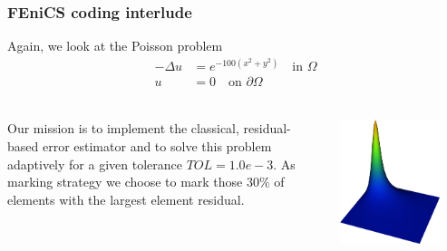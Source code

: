 \begin{frame}
    \frametitle{FEniCS coding interlude}
    Again, we look at the Poisson problem
    \begin{align*}
        -\Delta u &= e^{-100(x^2 + y^2)} \quad \text{in } \Omega \\
                u &= 0 \quad \text{on } \partial \Omega \\
    \end{align*}
    \vspace{-3em}
    \begin{columns}[c]
        \begin{column}{0.5\textwidth}
    Our mission is to implement the classical, residual-based error
    estimator and to solve this problem adaptively for a given
    tolerance $TOL=1.0e-3$. As marking strategy we choose to mark
    those $30 \%$ of elements with the largest element residual.
        \end{column}
        \begin{column}{0.5\textwidth}
    \begin{center}
        \includegraphics[width=0.8\textwidth]{png/solution-refinement-3.png}
    \end{center}
        \end{column}
    \end{columns}
\end{frame}
